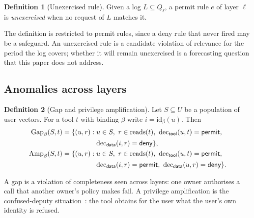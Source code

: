 \documentclass[preprint,12pt]{elsarticle}
\theoremstyle{definition}
\newtheorem{definition}{Definition}
\theoremstyle{remark}
\newcommand{\permit}{\mathsf{permit}}
\newcommand{\deny}{\mathsf{deny}}
\newcommand{\dec}{\mathrm{dec}}
\newcommand{\reads}{\mathrm{reads}}
\newcommand{\ident}{\mathrm{id}}
\newcommand{\Gap}{\mathrm{Gap}}
\newcommand{\Amp}{\mathrm{Amp}}
\begin{document}
\begin{definition}[Unexercised rule]\label{def:irrelevant}
Given a log $L \subseteq Q_\ell$, a permit rule $e$ of layer $\ell$ is \emph{unexercised} when no request of $L$ matches it.
\end{definition}
The definition is restricted to permit rules, since a deny rule that never fired may be a safeguard. An unexercised rule is a candidate violation of relevance for the period the log covers; whether it will remain unexercised is a forecasting question that this paper does not address.

\subsection{Anomalies across layers}
\begin{definition}[Gap and privilege amplification]\label{def:cross}
Let $S \subseteq U$ be a population of user vectors. For a tool $t$ with binding $\beta$ write $i = \ident_\beta(u)$. Then
\begin{align}
\Gap_\beta(S, t) = \{(u, r) :{}& u \in S,\ r \in \reads(t),\ \dec_{\mathsf{tool}}(u, t) = \permit, \notag\\
& \dec_{\mathsf{data}}(i, r) = \deny\}, \label{eq:gap}\\
\Amp_\beta(S, t) = \{(u, r) :{}& u \in S,\ r \in \reads(t),\ \dec_{\mathsf{tool}}(u, t) = \permit, \notag\\
& \dec_{\mathsf{data}}(i, r) = \permit,\ \dec_{\mathsf{data}}(u, r) = \deny\}. \label{eq:amp}
\end{align}
\end{definition}
A gap is a violation of completeness seen across layers: one owner authorises a call that another owner's policy makes fail. A privilege amplification is the confused-deputy situation~\cite{hardy1988deputy}: the tool obtains for the user what the user's own identity is refused.
\end{document}
